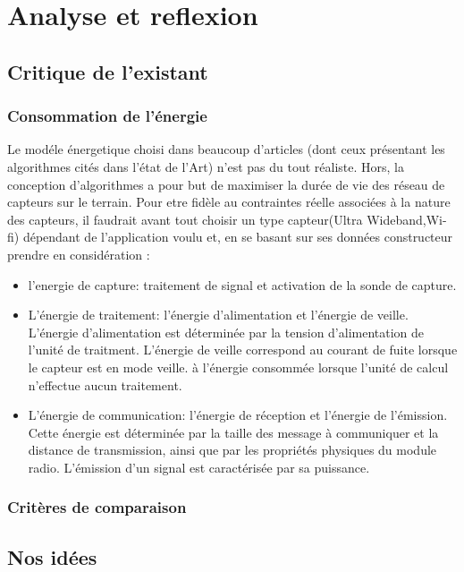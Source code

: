 
\chapter{Analyse et reflexion}\label{Analyse_et_reflexion}


\section{Critique de l'existant}
\subsection{Consommation de l'énergie}
	
Le modéle énergetique choisi dans beaucoup d'articles (dont ceux présentant les algorithmes cités dans l'état de l'Art) n'est pas du tout réaliste.
Hors, la conception d'algorithmes a pour but de maximiser la durée de vie des réseau de capteurs sur le terrain. Pour etre fidèle au contraintes 
réelle associées à la nature des capteurs, il faudrait avant tout choisir un type capteur(Ultra Wideband,Wi-fi) dépendant de l'application voulu et, en se basant sur ses données constructeur prendre en considération :
\begin{itemize}
\item l'energie de capture: traitement de signal et activation de la sonde de capture.
\item L’énergie de traitement: l’énergie d'alimentation et l’énergie de veille. L’énergie d'alimentation est déterminée par la tension d’alimentation de l'unité de traitment. L'énergie de veille correspond au courant de fuite lorsque le capteur est en mode veille.
à l’énergie consommée lorsque l’unité de calcul n’effectue aucun traitement.
\item L’énergie de communication: l’énergie de réception et l’énergie de l’émission. Cette énergie est déterminée par la taille des message à
communiquer et la distance de transmission, ainsi que par les propriétés physiques du module
radio. L’émission d’un signal est caractérisée par sa puissance. 
\end{itemize}
\subsection{Critères de comparaison}





\section{Nos idées}

